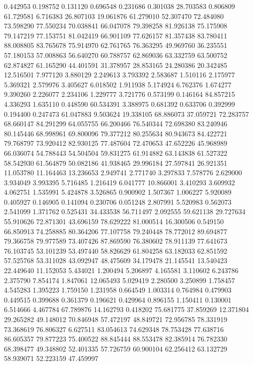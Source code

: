 0.442953
0.198752
0.131120
0.696548
0.231686
0.301038
28.703583
0.806809
61.729581
6.716383
26.807103
19.061876
61.279010
52.307470
72.484080
73.598290
77.550234
70.038841
66.047078
79.398258
81.926138
75.175908
79.147219
77.153751
81.042419
66.901109
77.626157
81.357438
83.780411
88.008805
83.765678
75.914970
62.761765
76.363295
49.969760
36.235551
57.180153
57.008863
56.640270
60.788757
62.869036
63.332759
63.500752
62.874827
61.165290
44.401591
31.378957
28.853165
24.280386
20.342485
12.516501
7.977120
3.880129
2.249613
3.793392
2.583687
1.510116
2.175977
5.369321
2.579976
3.405627
6.018502
1.911938
5.174924
6.762376
1.674277
9.390260
2.226077
2.234106
1.229777
3.721776
0.573199
0.146164
84.857215
4.336293
1.635110
0.448590
60.534391
3.388975
0.681392
0.633706
0.392999
0.194400
0.247473
61.047883
9.503624
19.338105
68.886073
37.059721
72.283757
68.660147
84.291299
64.055755
66.200466
76.540344
72.698380
83.240946
80.145446
68.998961
69.800096
79.377212
80.255634
80.943673
84.422721
79.768797
73.920412
82.930125
77.487604
72.470653
47.652226
45.968989
66.036074
54.788443
54.504504
59.831275
61.914882
63.143838
61.527322
58.542930
61.564879
50.082186
41.938465
29.996184
27.597841
26.921351
11.053780
11.164463
13.236653
2.949741
2.771740
3.297833
7.578776
2.629000
3.934049
3.993395
5.716485
1.216419
6.041777
10.866001
3.410293
3.609932
4.062751
1.535991
5.424878
3.526865
0.900902
1.507367
1.006227
5.920089
0.405927
0.146905
0.141094
0.230706
0.051248
2.807991
5.520983
0.562073
2.541099
1.371762
0.525431
34.433538
56.711497
2.092555
59.621138
29.727634
55.910626
72.871301
43.696159
78.629222
81.000514
16.300506
0.549150
66.850913
74.258885
80.364206
77.107758
79.240448
78.772012
89.694877
79.366758
79.977589
73.407426
87.869590
76.380602
78.911139
77.641673
76.103745
53.101239
53.497440
58.826629
61.804258
63.182033
62.851592
57.525768
53.311028
43.092947
48.475609
34.179478
21.145541
13.540423
22.449640
11.152053
5.434021
1.200494
5.206897
4.165581
3.110602
6.243786
2.375790
7.854174
1.847061
12.065493
5.029419
2.280500
3.250899
1.758457
4.545283
1.395223
1.759150
1.231958
0.664549
1.003314
0.764984
0.479903
0.449515
0.399688
0.361379
0.196621
0.429964
0.896155
1.150411
0.130001
6.514666
4.467784
67.789876
14.162793
0.418202
75.681775
37.859269
12.371804
29.265282
49.148012
70.846948
57.472197
48.849721
72.956785
78.331919
73.368619
76.806327
6.627511
83.054613
74.629348
78.753428
77.638716
86.605357
79.877223
75.400522
88.845444
88.553478
82.385914
76.782330
68.398477
49.348802
52.401335
57.726759
60.900104
62.256412
63.132729
58.939071
52.223159
47.459997
